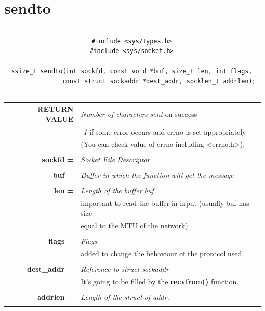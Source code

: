 \section{sendto}
\begin{center}
\begin{tabular}{c}
\begin{lstlisting}[linewidth=360pt, basicstyle=\footnotesize\sffamily,]
#include <sys/types.h>
#include <sys/socket.h>

ssize_t sendto(int sockfd, const void *buf, size_t len, int flags,
               const struct sockaddr *dest_addr, socklen_t addrlen);
\end{lstlisting}
\end{tabular}
\end{center}
\begin{table}[H]
\centering\footnotesize
\begin{tabular}{rl}
\textbf{RETURN VALUE} & {\textit{Number of characters sent} on success}\\
{} & {\textit{-1} if some error occurs and errno is set appropriately}\\
{} & {(You can check value of errno including <errno.h>).}\\
& \\
\textbf{sockfd =} & {\textit{Socket File Descriptor}}\\
&\\
\textbf{buf =} & {\textit{Buffer in which the function will get the message}}\\
&\\
\textbf{len =} & {\textit{Length of the buffer buf}}\\
&{important to read the buffer in input (usually buf has size}\\
&{equal to the MTU of the network)}\\
&\\
\textbf{flags =} & {\textit{Flags}}\\
{} & {added to change the behaviour of the protocol used.}\\
& \\
\textbf{dest\_addr =} & {\textit{Reference to struct sockaddr}}\\
{} & {It's going to be filled by the \textbf{recvfrom()} function.}\\
& \\
\textbf{addrlen =} & {\textit{Length of the struct of addr.}}\\
&\\
\end{tabular}
\end{table}

